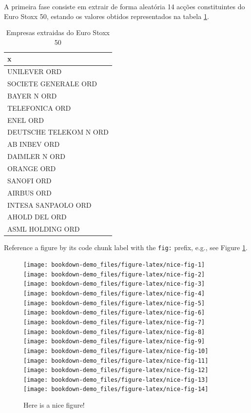 \documentclass[
  12pt,
  brazil,
  a4paper,
  openany]{book}
\newcommand{\passthrough}[1]{#1}
\begin{document}
A primeira fase consiste em extrair de forma aleatória 14 acções constituintes do Euro Stoxx 50, estando os valores obtidos representados na tabela \ref{tab:nice-tab}.

\begin{table}[!h]

\caption{\label{tab:nice-tab}Empresas extraidas do Euro Stoxx 50}
\centering
\begin{tabular}[t]{l}
\toprule
x\\
\midrule
UNILEVER ORD\\
SOCIETE GENERALE ORD\\
BAYER N ORD\\
TELEFONICA ORD\\
ENEL ORD\\
\addlinespace
DEUTSCHE TELEKOM N ORD\\
AB INBEV ORD\\
DAIMLER N ORD\\
ORANGE ORD\\
SANOFI ORD\\
\addlinespace
AIRBUS ORD\\
INTESA SANPAOLO ORD\\
AHOLD DEL ORD\\
ASML HOLDING ORD\\
\bottomrule
\end{tabular}
\end{table}

Reference a figure by its code chunk label with the \passthrough{\lstinline!fig:!} prefix, e.g., see Figure \ref{fig:nice-fig}.

\begin{figure}
\texttt{[image: bookdown-demo\_files/figure-latex/nice-fig-1]} \texttt{[image: bookdown-demo\_files/figure-latex/nice-fig-2]} \texttt{[image: bookdown-demo\_files/figure-latex/nice-fig-3]} \texttt{[image: bookdown-demo\_files/figure-latex/nice-fig-4]} \texttt{[image: bookdown-demo\_files/figure-latex/nice-fig-5]} \texttt{[image: bookdown-demo\_files/figure-latex/nice-fig-6]} \texttt{[image: bookdown-demo\_files/figure-latex/nice-fig-7]} \texttt{[image: bookdown-demo\_files/figure-latex/nice-fig-8]} \texttt{[image: bookdown-demo\_files/figure-latex/nice-fig-9]} \texttt{[image: bookdown-demo\_files/figure-latex/nice-fig-10]} \texttt{[image: bookdown-demo\_files/figure-latex/nice-fig-11]} \texttt{[image: bookdown-demo\_files/figure-latex/nice-fig-12]} \texttt{[image: bookdown-demo\_files/figure-latex/nice-fig-13]} \texttt{[image: bookdown-demo\_files/figure-latex/nice-fig-14]} \caption{Here is a nice figure!}\label{fig:nice-fig}
\end{figure}
\end{document}
